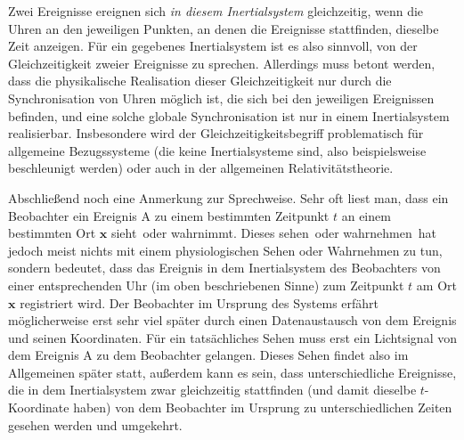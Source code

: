 Zwei Ereignisse ereignen sich
{\em in diesem Inertialsystem} 
gleichzeitig, wenn die Uhren an den
jeweiligen Punkten, an denen die
Ereignisse stattfinden, dieselbe Zeit anzeigen.
F\"ur ein gegebenes Inertialsystem
ist es also sinnvoll, von der Gleichzeitigkeit
zweier Ereignisse zu sprechen. Allerdings
muss betont werden, dass die physikalische
Realisation dieser Gleichzeitigkeit
nur durch die Synchronisation von Uhren
m\"oglich ist, die sich bei den jeweiligen
Ereignissen befinden, und eine solche
globale Synchronisation ist nur in einem
Inertialsystem realisierbar. Insbesondere
wird der Gleichzeitigkeitsbegriff problematisch
f\"ur allgemeine Bezugssysteme (die keine
Inertialsysteme sind, also beispielsweise
beschleunigt werden) oder auch in 
der allgemeinen Relativit\"atstheorie.

Abschlie\ss end noch eine Anmerkung
zur Sprechweise. Sehr oft liest man, dass
ein Beobachter ein Ereignis A zu einem
bestimmten Zeitpunkt $t$ an einem bestimmten
Ort $\pmb{x}$ \glqq sieht\grqq\ oder \glqq wahrnimmt\grqq. 
Dieses \glqq sehen\grqq\ oder \glqq wahrnehmen\grqq\
hat jedoch meist nichts mit einem
physiologischen Sehen oder Wahrnehmen
zu tun, sondern bedeutet, dass das 
Ereignis in dem Inertialsystem des 
Beobachters von einer entsprechenden
Uhr (im oben beschriebenen Sinne)
zum Zeitpunkt $t$ am Ort $\pmb{x}$
registriert wird. Der Beobachter im 
Ursprung des Systems erf\"ahrt
m\"oglicherweise erst sehr viel
sp\"ater durch einen Datenaustausch
von dem Ereignis und seinen Koordinaten.
F\"ur ein tats\"achliches Sehen muss erst
ein Lichtsignal von dem Ereignis A zu
dem Beobachter gelangen. Dieses
Sehen findet also im Allgemeinen sp\"ater
statt, au\ss erdem kann es sein, dass
unterschiedliche Ereignisse, die in dem
Inertialsystem zwar gleichzeitig stattfinden
(und damit dieselbe $t$-Koordinate
haben) von dem Beobachter im Ursprung
zu unterschiedlichen Zeiten gesehen
werden und umgekehrt. 


